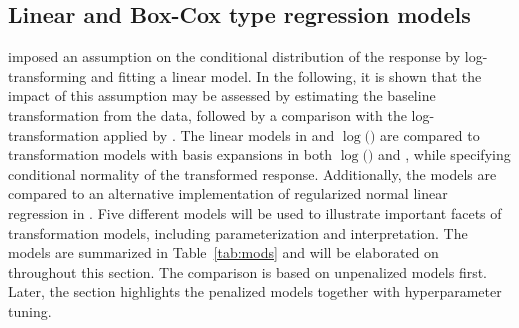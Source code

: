 \subsection{Linear and Box-Cox type regression models}

\citet{zou2005regularization} imposed an assumption on the conditional distribution of the
response by log-transforming and fitting a linear model. In the following, it is
shown that the impact of this assumption may be assessed by estimating the baseline
transformation from the data, followed by a comparison with the
log-transformation applied by \citet{zou2005regularization}. 
The linear models in  and $\log($$)$
are compared to transformation models with basis expansions in both $\log($$)$
and , while specifying conditional normality of the transformed response.
Additionally, the models are compared to an alternative implementation of regularized
normal linear regression in . Five different models will be used
to illustrate important facets of transformation models, including parameterization and
interpretation. The models are summarized in Table~\ref{tab:mods} and will be
elaborated on throughout this section. The comparison is based on unpenalized
models first. Later, the section highlights the penalized models together with
hyperparameter tuning.

